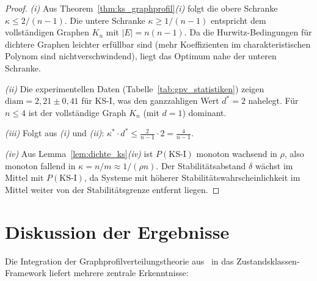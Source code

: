 ﻿\documentclass[12pt, a4paper, titlepage]{report}
\theoremstyle{definition}
\theoremstyle{remark}
\newcommand{\KS}{\mathrm{KS}}
\begin{document}
\begin{proof}
\textit{(i)} Aus Theorem~\ref{thm:ks_graphprofil}\textit{(i)} folgt die obere Schranke
$\kappa \leq 2/(n-1)$. Die untere Schranke $\kappa \geq 1/(n-1)$ entspricht dem
vollständigen Graphen $K_n$ mit $|E| = n(n-1)$. Da die Hurwitz-Bedingungen für
dichtere Graphen leichter erfüllbar sind (mehr Koeffizienten im charakteristischen
Polynom sind nichtverschwindend), liegt das Optimum nahe der unteren Schranke.

\textit{(ii)} Die experimentellen Daten (Tabelle~\ref{tab:gpv_statistiken}) zeigen
$\mathrm{diam} = 2{,}21 \pm 0{,}41$ für KS-I, was den ganzzahligen Wert $d^* = 2$
nahelegt. Für $n \leq 4$ ist der vollständige Graph $K_n$ (mit $d = 1$) dominant.

\textit{(iii)} Folgt aus \textit{(i)} und \textit{(ii)}: $\kappa^* \cdot d^* \leq
\frac{2}{n-1} \cdot 2 = \frac{4}{n-1}$.

\textit{(iv)} Aus Lemma~\ref{lem:dichte_ks}\textit{(iv)} ist $P(\KS\text{-I})$
monoton wachsend in $\rho$, also monoton fallend in $\kappa = n/m \approx 1/(\rho n)$.
Der Stabilitätsabstand $\delta$ wächst im Mittel mit $P(\KS\text{-I})$, da Systeme
mit höherer Stabilitätswahrscheinlichkeit im Mittel weiter von der Stabilitätsgrenze
entfernt liegen.
\end{proof}

\section{Diskussion der Ergebnisse}

Die Integration der Graphprofilverteilungstheorie aus~\citep{epp2026graphs} in das
Zustandsklassen-Framework liefert mehrere zentrale Erkenntnisse:
\end{document}
